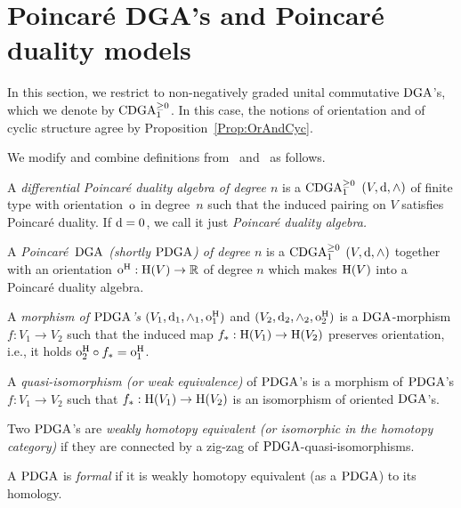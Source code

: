 \documentclass[\MainFolder/Text.tex]{subfiles}
\begin{document}
\section{Poincar\'e DGA's and Poincar\'e duality models}\label{SubSec:PoincModel}



In this section, we restrict to non-negatively graded unital commutative $\mathrm{DGA}$'s, which we denote by $\mathrm{CDGA}_{1}^{\ge 0}$. In this case, the notions of orientation and of cyclic structure agree by Proposition~\ref{Prop:OrAndCyc}.

We modify and combine definitions from~\cite{Van2019} and~\cite{Lambrechts2007} as follows.

\begin{Definition}\label{Def:PDGA}
A \emph{differential Poincar\'e duality algebra of degree $n$} is a $\mathrm{CDGA}_{1}^{\ge 0}$ $(V,\mathrm{d},\wedge)$ of finite type with orientation~$\mathrm{o}$ in degree~$n$ such that the induced pairing on $V$ satisfies Poincar\'e duality. If $\mathrm{d} = 0$, we call it just \emph{Poincar\'e duality algebra.}

A \emph{Poincar\'e~$\mathrm{DGA}$ (shortly $\mathrm{PDGA}$) of degree $n$} is a $\mathrm{CDGA}_{1}^{\ge 0}$ $(V,\mathrm{d},\wedge)$ together with an orientation $\mathrm{o}^{\mathrm{H}}: \mathrm{H}(V) \rightarrow \mathbb{R}$  of degree $n$ which makes $\mathrm{H}(V)$ into a Poincar\'e duality algebra.

A \emph{morphism of $\mathrm{PDGA}$'s} $(V_1,\mathrm{d}_1,\wedge_1,\mathrm{o}^{\mathrm{H}}_1)$ and $(V_2,\mathrm{d}_2,\wedge_2,\mathrm{o}^{\mathrm{H}}_2)$ is a $\mathrm{DGA}$-morphism $f: V_1 \rightarrow V_2$ such that the induced map $f_*: \mathrm{H}(V_1) \rightarrow \mathrm{H}(V_2)$ preserves orientation, i.e., it holds $\mathrm{o}_2^{\mathrm{H}} \circ f_* = \mathrm{o}_1^{\mathrm{H}}$.

A \emph{quasi-isomorphism (or weak equivalence)} of $\mathrm{PDGA}$'s is a morphism of $\mathrm{PDGA}$'s $f: V_1 \rightarrow V_2$ such that $f_*: \mathrm{H}(V_1) \rightarrow \mathrm{H}(V_2)$ is an isomorphism of oriented $\mathrm{DGA}$'s.

Two $\mathrm{PDGA}$'s are \emph{weakly homotopy equivalent (or isomorphic in the homotopy category)} if they are connected by a zig-zag of $\mathrm{PDGA}$-quasi-isomorphisms.

A $\mathrm{PDGA}$ is \emph{formal} if it is weakly homotopy equivalent (as a $\mathrm{PDGA}$) to its homology.
\end{Definition}
\end{document}
